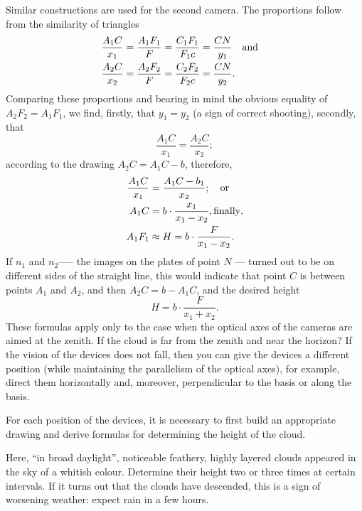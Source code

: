 Similar constructions are used for the second camera. The proportions follow from the similarity of triangles
\begin{align*}%
\frac{A_{1}C}{x_{1}} & = \frac{A_{1}F_{1}}{F} = \frac{C_{1}F_{1}}{F_{1}c} = \frac{CN}{y_{1}} \qand \\
\frac{A_{2}C}{x_{2}} & = \frac{A_{2}F_{2}}{F} = \frac{C_{2}F_{2}}{F_{2}c} = \frac{CN}{y_{2}}.
\end{align*}
Comparing these proportions and bearing in mind the obvious equality of $A_{2}F_{2} = A_{1}F_{1}$, we find, firstly, that $y_{1} = y_{2}$ (a sign of correct shooting), secondly, that
\begin{equation*}%
\frac{A_{1}C}{x_{1}} = \frac{A_{2}C}{x_{2}};
\end{equation*}	
according to the drawing $A_{2}C = A_{1}C - b$, therefore,
\begin{align*}%
\frac{A_{1}C}{x_{1}} & = \frac{A_{1}C - b_{1}}{x_{2}}; \qor \\
A_{1}C & = b \cdot \frac{x_{1}}{x_{1} - x_{2}}, \text{finally},\\
A_{1}F_{1} & \approx  H = b \cdot \frac{F}{x_{1} - x_{2}}.
\end{align*}	
If $n_{1}$ and $n_{2}$--— the images on the plates of point $N$ — turned out to be on different sides of the straight line, this would indicate that point $C$ is between points $A_{1}$ and $A_{2}$, and then $A_{2}C = b - A_{1}C$, and the desired height
\begin{equation*}%
 H = b \cdot \frac{F}{x_{1} + x_{2}}.
\end{equation*}
These formulas apply only to the case when the optical axes of the cameras are aimed at the zenith. If the cloud is far from the zenith and near the horizon? If the vision of the devices does not fall, then you can give the devices a different position (while maintaining the parallelism of the optical axes), for example, direct them horizontally and, moreover, perpendicular to the basis or along the basis. 

For each position of the devices, it is necessary to first build an appropriate drawing and derive formulas for determining the height of the cloud.

\ques Here, ``in broad daylight'', noticeable feathery, highly layered clouds appeared in the sky of a whitish colour. Determine their height two or three times at certain intervals. If it turns out that the clouds have descended, this is a sign of worsening weather: expect rain in a few hours.

